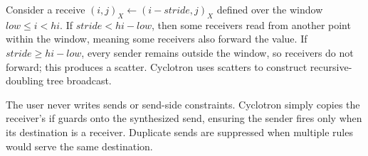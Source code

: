 \documentclass[sigplan, nonacm]{acmart}
\begin{document}
Consider a receive $(i,j)_X\leftarrow(i-stride,j)_X$  defined over the window $low \leq i < hi$. If $stride< hi-low$, then some receivers read from another point within the window, meaning some receivers also forward the value. If $stride \geq hi-low$, every sender remains outside the window, so receivers do not forward; this produces a scatter. Cyclotron uses scatters to construct recursive-doubling tree broadcast. 

The user never writes sends or send-side constraints. Cyclotron simply copies the receiver's if guards onto the synthesized send, ensuring the sender fires only when its destination is a receiver. Duplicate sends are suppressed when multiple rules would serve the same destination.


\end{document}
